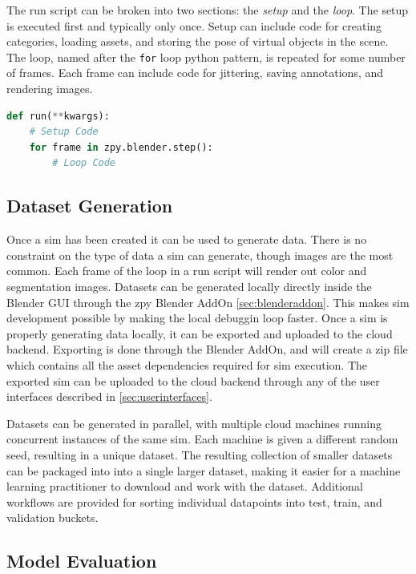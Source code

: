 \documentclass{article}
\begin{document}
The run script can be broken into two sections: the \emph{setup} and the \emph{loop}. The setup is executed first and typically only once. Setup can include code for creating categories, loading assets, and storing the pose of virtual objects in the scene. The loop, named after the \lstinline{for} loop python pattern, is repeated for some number of frames. Each frame can include code for jittering, saving annotations, and rendering images.

\begin{lstlisting}[language=Python,caption={Basic structure of the run function in a sim run script.},label={lst:setuploop}]
def run(**kwargs):
	# Setup Code
	for frame in zpy.blender.step():
		# Loop Code
\end{lstlisting}


\subsection{Dataset Generation}
\label{sec:generation}

Once a sim has been created it can be used to generate data. There is no constraint on the type of data a sim can generate, though images are the most common. Each frame of the loop in a run script will render out color and segmentation images. Datasets can be generated locally directly inside the Blender GUI through the zpy Blender AddOn \ref{sec:blenderaddon}. This makes sim development possible by making the local debuggin loop faster. Once a sim is properly generating data locally, it can be exported and uploaded to the cloud backend. Exporting is done through the Blender AddOn, and will create a zip file which contains all the asset dependencies required for sim execution. The exported sim can be uploaded to the cloud backend through any of the user interfaces described in \ref{sec:userinterfaces}.

Datasets can be generated in parallel, with multiple cloud machines running concurrent instances of the same sim. Each machine is given a different random seed, resulting in a unique dataset. The resulting collection of smaller datasets can be packaged into into a single larger dataset, making it easier for a machine learning practitioner to download and work with the dataset. Additional workflows are provided for sorting individual datapoints into test, train, and validation buckets.

\subsection{Model Evaluation}
\label{sec:evaluation}
\end{document}
